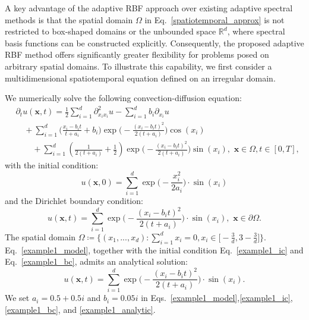 A key advantage of the adaptive RBF approach over existing adaptive spectral methods is that the spatial domain $\Omega$ in Eq.~\eqref{spatiotemporal_approx} is not restricted to box-shaped domains or the unbounded space $\mathbb{R}^d$, where spectral basis functions can be constructed explicitly. Consequently, the proposed adaptive RBF method offers significantly greater flexibility for problems posed on arbitrary spatial domains. To illustrate this capability, we first consider a multidimensional spatiotemporal equation defined on an irregular domain.

\begin{example}
\label{example1}
    \rm
We numerically solve the following convection-diffusion equation: 
\begin{equation}
\begin{aligned}
    &\partial_tu(\bm{x}, t) = \frac{1}{2}\sum_{i=1}^d \partial_{x_ix_i}^2u - \sum_{i=1}^d b_i \partial_{x_i}u \\
    &\quad+ \sum_{i=1}^d \big(\frac{x_i-b_it}{t+a_i} + b_i\big)\exp\Big(- \frac{(x_i - b_it)^2}{2(t+a_i)}\Big) \cos(x_i) \\
    &\quad\quad+ \sum_{i=1}^d(\frac{1}{2(t+a_i)}+\frac{1}{2})\exp\Big(- \frac{(x_i - b_it)^2}{ 2(t+a_i)}\Big) \sin(x_i),\,\, \bm{x}\in\Omega, t\in[0, T],
    \end{aligned}
    \label{example1_model}
\end{equation}
with the initial condition:
\begin{equation}
    u(\bm{x}, 0) = \sum_{i=1}^d\exp\big(- \frac{x_i^2}{ 2a_i}\big)\cdot\sin(x_i)
    \label{example1_ic}
\end{equation}
and the Dirichlet boundary condition:
\begin{equation}
    u(\bm{x}, t) = \sum_{i=1}^d\exp\big(- \frac{(x_i - b_it)^2}{ 2(t+a_i)}\big)\cdot\sin(x_i), \,\, \bm{x}\in\partial\Omega.
    \label{example1_bc}
\end{equation}
The spatial domain $\Omega \coloneqq \Big\{(x_1,...,x_d):\sum_{i=1}^dx_i=0, x_i\in\big[-\frac{3}{d}, 3 - \frac{3}{d}\big]\Big\}$.  
Eq.~\eqref{example1_model}, together with the initial condition Eq.~\eqref{example1_ic} and Eq.~\eqref{example1_bc}, admits an analytical solution:
\begin{equation}
    u(\bm{x}, t) = \sum_{i=1}^d\exp\big(- \frac{(x_i - b_it)^2}{ 2(t+a_i)}\big)\cdot\sin(x_i).
    \label{example1_analytic}
\end{equation}
We set $a_i = 0.5 + 0.5i$ and $b_i=0.05i$ in Eqs.~\eqref{example1_model},\eqref{example1_ic}, \eqref{example1_bc}, and \eqref{example1_analytic}.

\end{example}
